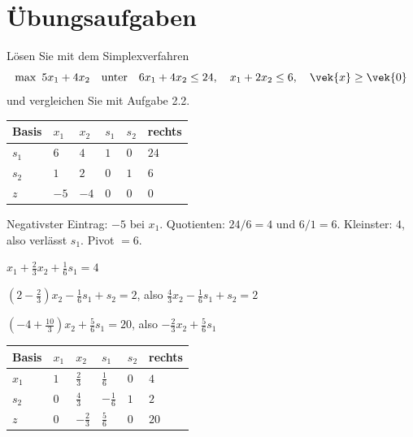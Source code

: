 \section{Übungsaufgaben}

\begin{aufgabe}
Lösen Sie mit dem Simplexverfahren
\[ \max\ 5x_1+4x_2 \quad\text{unter}\quad 6x_1+4x_2 \le 24,\quad x_1+2x_2 \le 6,\quad \vek{x}\ge\vek{0} \]
und vergleichen Sie mit Aufgabe 2.2.

\loesung
{}
\begin{center}
{\small
\renewcommand{\arraystretch}{1.48}
\begin{tabular}{@{}P{1.6cm}P{1.4cm}P{1.4cm}P{1.4cm}P{1.4cm}P{1.4cm}@{}}
\toprule
\textbf{Basis} & $x_1$ & $x_2$ & $s_1$ & $s_2$ & \textbf{rechts}\\
\midrule
$s_1$ & $6$ & $4$ & $1$ & $0$ & $24$\\
$s_2$ & $1$ & $2$ & $0$ & $1$ & $6$\\
\midrule
$z$ & $-5$ & $-4$ & $0$ & $0$ & $0$\\
\bottomrule
\end{tabular}}
\end{center}

Negativster Eintrag: $-5$ bei $x_1$. Quotienten: $24/6 = 4$ und $6/1 = 6$. Kleinster: $4$, also verlässt $s_1$. Pivot $= 6$.

 $x_1 + \frac23 x_2 + \frac16 s_1 = 4$

 $\left(2-\frac23\right)x_2 - \frac16 s_1 + s_2 = 2$, also $\frac43 x_2 - \frac16 s_1 + s_2 = 2$

 $\left(-4+\frac{10}{3}\right)x_2 + \frac56 s_1 = 20$, also $-\frac23 x_2 + \frac56 s_1$

\begin{center}
{\small
\renewcommand{\arraystretch}{1.48}
\begin{tabular}{@{}P{1.6cm}P{1.4cm}P{1.4cm}P{1.4cm}P{1.4cm}P{1.4cm}@{}}
\toprule
\textbf{Basis} & $x_1$ & $x_2$ & $s_1$ & $s_2$ & \textbf{rechts}\\
\midrule
$x_1$ & $1$ & $\tfrac23$ & $\tfrac16$ & $0$ & $4$\\
$s_2$ & $0$ & $\tfrac43$ & $-\tfrac16$ & $1$ & $2$\\
\midrule
$z$ & $0$ & $-\tfrac23$ & $\tfrac56$ & $0$ & $20$\\
\bottomrule
\end{tabular}}
\end{center}


\end{aufgabe}

